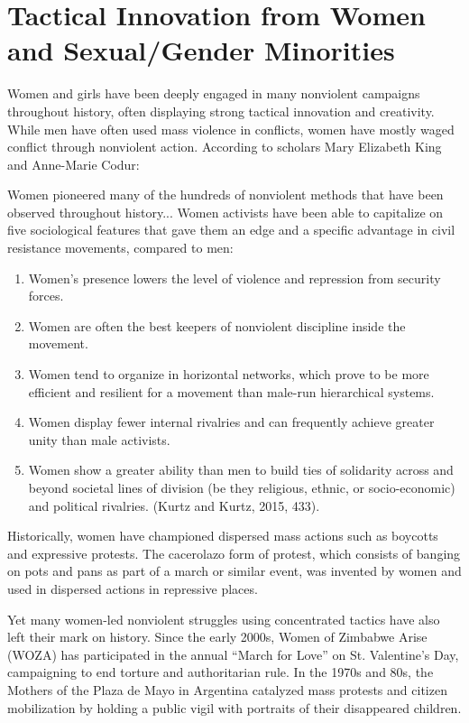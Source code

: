 \documentclass[twoside,a4paper,12pt,fleqn,openany]{extbook}
\begin{document}
\section*{Tactical Innovation from Women and Sexual/Gender Minorities}

Women and girls have been deeply engaged in many nonviolent campaigns throughout history, often displaying strong tactical innovation and creativity. While men have often used mass violence in conflicts, women have mostly waged conflict through nonviolent action. According to scholars Mary Elizabeth King and Anne-Marie Codur:

Women pioneered many of the hundreds of nonviolent methods that have been observed throughout history... Women activists have been able to capitalize on five sociological features that gave them an edge and a specific advantage in civil resistance movements, compared to men:

\begin{enumerate}
\item Women’s presence lowers the level of violence and repression from security forces.
\item Women are often the best keepers of nonviolent discipline inside the movement.
\item Women tend to organize in horizontal networks, which prove to be more efficient and resilient for a movement than male-run hierarchical systems.
\item Women display fewer internal rivalries and can frequently achieve greater unity than male activists.
\item Women show a greater ability than men to build ties of solidarity across and beyond societal lines of division (be they religious, ethnic, or socio-economic) and political rivalries. (Kurtz and Kurtz, 2015, 433).
\end{enumerate}

Historically, women have championed dispersed mass actions such as boycotts and expressive protests. The cacerolazo form of protest, which consists of banging on pots and pans as part of a march or similar event, was invented by women and used in dispersed actions in repressive places.

Yet many women-led nonviolent struggles using concentrated tactics have also left their mark on history. Since the early 2000s, Women of Zimbabwe Arise (WOZA) has participated in the annual “March for Love” on St. Valentine’s Day, campaigning to end torture and authoritarian rule. In the 1970s and 80s, the Mothers of the Plaza de Mayo in Argentina catalyzed mass protests and citizen mobilization by holding a public vigil with portraits of their disappeared children.
\end{document}
